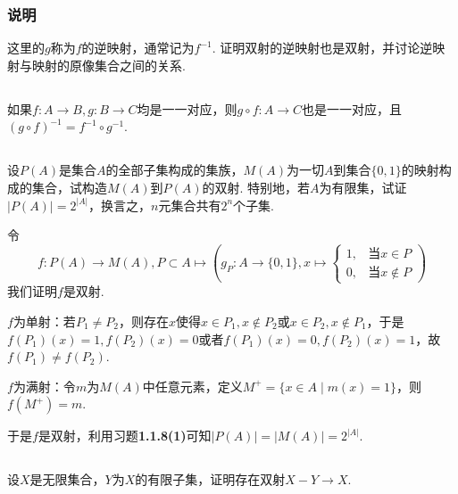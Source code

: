 \subsubsection{说明}
这里的$g$称为$f$的{\heiti 逆映射}，通常记为$f^{-1}$. 证明双射的逆映射也是双射，并讨论逆映射与映射的原像集合之间的关系.

\Proofbyintimidation

\subsection{}
如果$f:A\rightarrow B, g:B\rightarrow C$均是一一对应，则$g\circ f:A\rightarrow C$也是一一对应，且$(g\circ f)^{-1}=f^{-1}\circ g^{-1}$.


\subsection{}
设$P(A)$是集合$A$的全部子集构成的集族，$M(A)$为一切$A$到集合$\{0,1\}$的映射构成的集合，试构造$M(A)$到$P(A)$的双射. 特别地，若$A$为有限集，试证$|P(A)|=2^{|A|}$，换言之，$n$元集合共有$2^n$个子集.

\jie 令
$$f:P(A)\rightarrow M(A), P\subset A\mapsto \left(
g_P: A\rightarrow \{0,1\},
x\mapsto
\begin{cases}
1, & \text{当}x\in P\\
0, & \text{当}x\notin P
\end{cases}
\right)$$
我们证明$f$是双射.

$f$为单射：若$P_1\neq P_2$，则存在$x$使得$x\in P_1, x\notin P_2$或$x\in P_2, x\notin P_1$，于是$f(P_1)(x)=1,f(P_2)(x)=0$或者$f(P_1)(x)=0,f(P_2)(x)=1$，故$f(P_1)\neq f(P_2)$.

$f$为满射：令$m$为$M(A)$中任意元素，定义$M^+=\{x\in A\mid m(x)=1\}$，则$f(M^+)=m$.

于是$f$是双射，利用{\heiti 习题}\textbf{1.1.8(1)}可知$|P(A)|=|M(A)|=2^{|A|}$.

\subsection{}
设$X$是无限集合，$Y$为$X$的有限子集，证明存在双射$X-Y\rightarrow X$.

